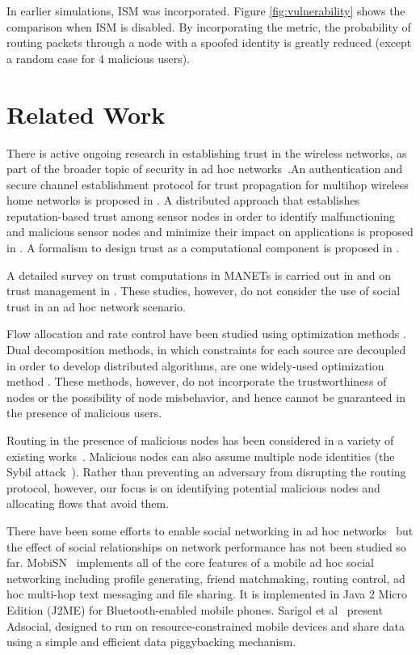 \documentclass[conference]{IEEEtran}
\begin{document}
In earlier simulations, ISM was incorporated. Figure \ref{fig:vulnerability} shows the comparison when ISM is disabled.  By incorporating the metric, the probability of routing packets through a node with a spoofed identity is greatly reduced (except a random case for 4 malicious users).

\section{Related Work}
\label{sec:related}
There is active ongoing research in establishing trust in the wireless networks, as part of the broader topic of security in ad hoc networks~\cite{hubaux2001quest}.An authentication and secure channel establishment protocol for trust propagation for multihop wireless home networks is proposed in \cite{trust_propagation}. A distributed approach that establishes reputation-based trust among sensor nodes in order to identify malfunctioning and malicious sensor nodes and minimize their impact on applications is proposed in \cite{statistical_trust}. A formalism to design trust as a computational component is proposed in \cite{trust_computational}.


 A detailed survey on trust computations in MANETs is carried out in \cite{kannan_trust} and on trust management in \cite{jinhee_trust}. These studies, however, do not consider the use of social  trust in an ad hoc network scenario.



Flow allocation and rate control have been studied using optimization methods \cite{kelly1998rate}.  Dual decomposition methods, in which constraints for each source are decoupled in order to develop distributed algorithms, are one widely-used optimization method \cite{chiang2007layering}.  These methods, however, do not incorporate the trustworthiness of nodes or the possibility of node misbehavior, and hence cannot be guaranteed in the presence of malicious users.

Routing in the presence of malicious nodes has been considered in a variety of existing works~\cite{marti2000mitigating,karlof2003secure}.  Malicious nodes can also assume multiple node identities (the Sybil attack~\cite{newsome2004sybil,yu2006sybilguard}).  Rather than preventing an adversary from disrupting the routing protocol, however, our focus is on identifying potential malicious nodes and allocating flows that avoid them.

There have been some efforts to enable social networking in ad hoc networks~\cite{li09mobisn,sarigl09} but the effect of social relationships on network performance has not been studied so far. MobiSN~\cite{li09mobisn} implements all of the core features of a mobile ad hoc social networking including profile generating, friend matchmaking, routing control, ad hoc multi-hop text messaging and file sharing. It is implemented in Java 2 Micro Edition (J2ME) for Bluetooth-enabled mobile phones. Sarigol et al~\cite{sarigl09}
 present Adsocial, designed to run on resource-constrained mobile devices and share data using a simple and efficient data piggybacking mechanism. 
\end{document}
